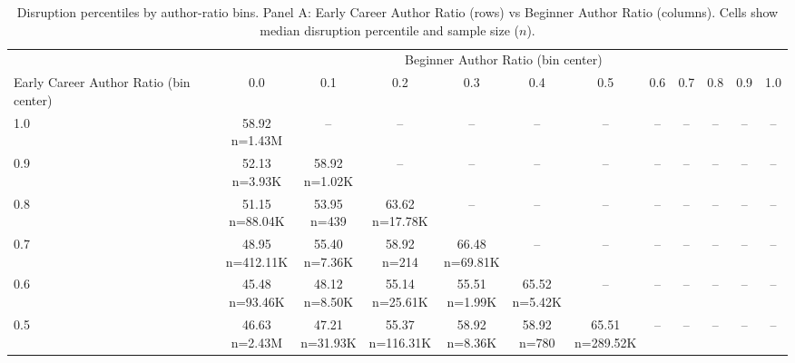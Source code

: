 \begin{table}\centering
            \caption{Disruption percentiles by author-ratio bins. Panel A: Early Career Author Ratio (rows) vs Beginner Author Ratio (columns). Cells show median disruption percentile and sample size ($n$).}
            \scriptsize
            \setlength\tabcolsep{4pt}
            \renewcommand{\arraystretch}{1.1}
            \begin{tabular}{lccccccccccc}
            \toprule
            & \multicolumn{11}{c}{Beginner Author Ratio (bin center)} \\
            \cmidrule(lr){2-12}
            Early Career Author Ratio (bin center) & 0.0 & 0.1 & 0.2 & 0.3 & 0.4 & 0.5 & 0.6 & 0.7 & 0.8 & 0.9 & 1.0 \\
            \midrule
            1.0 & \makecell{58.92 \\ \scriptsize n=1.43M} & -- & -- & -- & -- & -- & -- & -- & -- & -- & -- \\
0.9 & \makecell{52.13 \\ \scriptsize n=3.93K} & \makecell{58.92 \\ \scriptsize n=1.02K} & -- & -- & -- & -- & -- & -- & -- & -- & -- \\
0.8 & \makecell{51.15 \\ \scriptsize n=88.04K} & \makecell{53.95 \\ \scriptsize n=439} & \makecell{63.62 \\ \scriptsize n=17.78K} & -- & -- & -- & -- & -- & -- & -- & -- \\
0.7 & \makecell{48.95 \\ \scriptsize n=412.11K} & \makecell{55.40 \\ \scriptsize n=7.36K} & \makecell{58.92 \\ \scriptsize n=214} & \makecell{66.48 \\ \scriptsize n=69.81K} & -- & -- & -- & -- & -- & -- & -- \\
0.6 & \makecell{45.48 \\ \scriptsize n=93.46K} & \makecell{48.12 \\ \scriptsize n=8.50K} & \makecell{55.14 \\ \scriptsize n=25.61K} & \makecell{55.51 \\ \scriptsize n=1.99K} & \makecell{65.52 \\ \scriptsize n=5.42K} & -- & -- & -- & -- & -- & -- \\
0.5 & \makecell{46.63 \\ \scriptsize n=2.43M} & \makecell{47.21 \\ \scriptsize n=31.93K} & \makecell{55.37 \\ \scriptsize n=116.31K} & \makecell{58.92 \\ \scriptsize n=8.36K} & \makecell{58.92 \\ \scriptsize n=780} & \makecell{65.51 \\ \scriptsize n=289.52K} & -- & -- & -- & -- & -- \\

\end{tabular}
\end{table}
